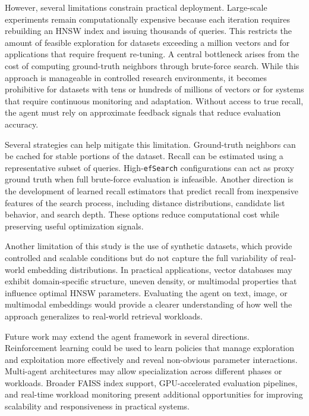 \documentclass{article}
\begin{document}
However, several limitations constrain practical deployment. Large-scale experiments remain computationally
expensive because each iteration requires rebuilding an HNSW index and issuing thousands of queries.
This restricts the amount of feasible exploration for datasets exceeding a million vectors and for
applications that require frequent re-tuning. A central bottleneck arises from the cost of computing
ground-truth neighbors through brute-force search. While this approach is manageable in controlled
research environments, it becomes prohibitive for datasets with tens or hundreds of millions of
vectors or for systems that require continuous monitoring and adaptation. Without access to true
recall, the agent must rely on approximate feedback signals that reduce evaluation accuracy.

Several strategies can help mitigate this limitation. Ground-truth neighbors can be cached for
stable portions of the dataset. Recall can be estimated using a representative subset of queries.
High-\texttt{efSearch} configurations can act as proxy ground truth when full brute-force evaluation is
infeasible. Another direction is the development of learned recall estimators that predict recall
from inexpensive features of the search process, including distance distributions, candidate list
behavior, and search depth. These options reduce computational cost while preserving useful
optimization signals.

Another limitation of this study is the use of synthetic datasets, which provide controlled and
scalable conditions but do not capture the full variability of real-world embedding distributions.
In practical applications, vector databases may exhibit domain-specific structure, uneven density,
or multimodal properties that influence optimal HNSW parameters. Evaluating the agent on text,
image, or multimodal embeddings would provide a clearer understanding of how well the approach
generalizes to real-world retrieval workloads.
   
Future work may extend the agent framework in several directions. Reinforcement learning could be
used to learn policies that manage exploration and exploitation more effectively and reveal
non-obvious parameter interactions. Multi-agent architectures may allow specialization across
different phases or workloads. Broader FAISS index support, GPU-accelerated evaluation pipelines,
and real-time workload monitoring present additional opportunities for improving scalability and
responsiveness in practical systems.
\end{document}
